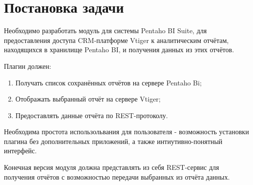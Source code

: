 \chapter{Постановка задачи}
Необходимо разработать модуль для системы Pentaho BI Suite, для предоставления доступа CRM-платформе Vtiger к аналитическим отчётам, находящихся в хранилище Pentaho BI, и получения данных из этих отчётов.

Плагин должен:

\begin{enumerate}
	\item Получать список сохранённых отчётов на сервере Pentaho Bi;
	\item Отображать выбранный отчёт на сервере Vtiger;
	\item Предоставлять данные отчёта по REST-протоколу.
\end{enumerate}

Необходима простота использольвания для пользователя - возможность установки плагина без дополнительных приложений, а также интиутивно-понятный интерфейс.

Конечная версия модуля должна представлять из себя REST-сервис для получения отчётов с возможностью передачи выбранных из отчёта данных.
